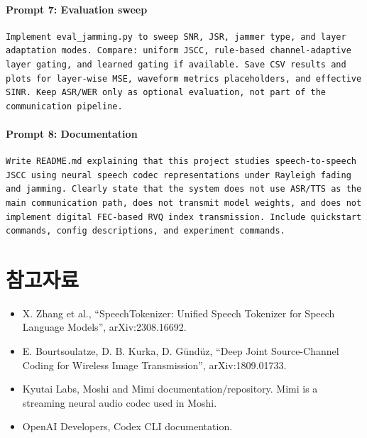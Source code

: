 \documentclass[11pt,a4paper]{article}
\begin{document}
\paragraph{Prompt 7: Evaluation sweep}
\begin{lstlisting}[style=promptstyle]
Implement eval_jamming.py to sweep SNR, JSR, jammer type, and layer adaptation modes. Compare: uniform JSCC, rule-based channel-adaptive layer gating, and learned gating if available. Save CSV results and plots for layer-wise MSE, waveform metrics placeholders, and effective SINR. Keep ASR/WER only as optional evaluation, not part of the communication pipeline.
\end{lstlisting}

\paragraph{Prompt 8: Documentation}
\begin{lstlisting}[style=promptstyle]
Write README.md explaining that this project studies speech-to-speech JSCC using neural speech codec representations under Rayleigh fading and jamming. Clearly state that the system does not use ASR/TTS as the main communication path, does not transmit model weights, and does not implement digital FEC-based RVQ index transmission. Include quickstart commands, config descriptions, and experiment commands.
\end{lstlisting}

\section*{참고자료}
\begin{itemize}
    \item X. Zhang et al., ``SpeechTokenizer: Unified Speech Tokenizer for Speech Language Models'', arXiv:2308.16692.
    \item E. Bourtsoulatze, D. B. Kurka, D. G\"und\"uz, ``Deep Joint Source-Channel Coding for Wireless Image Transmission'', arXiv:1809.01733.
    \item Kyutai Labs, Moshi and Mimi documentation/repository. Mimi is a streaming neural audio codec used in Moshi.
    \item OpenAI Developers, Codex CLI documentation.
\end{itemize}
\end{document}
